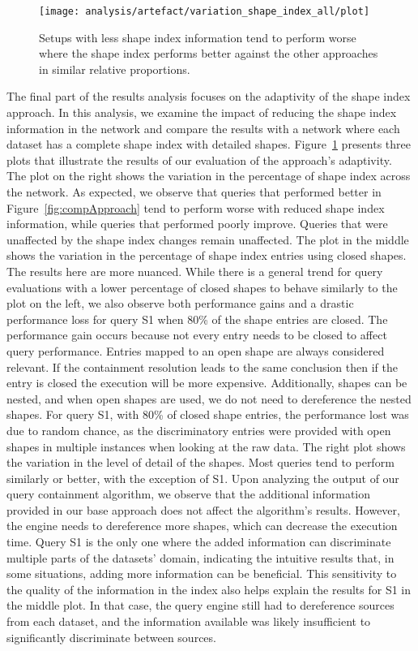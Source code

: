 \begin{figure}[h]
    \centering
    \texttt{[image: analysis/artefact/variation\_shape\_index\_all/plot]}
    \caption{Setups with less shape index information tend to perform worse where the shape index performs
    better against the other approaches in similar relative proportions.
    }
    \label{fig:adaptShapeIndex}
\end{figure}

The final part of the results analysis focuses on the adaptivity of the shape index approach.
In this analysis, we examine the impact of reducing the shape index information in the network and compare the results with a network where each dataset has a complete shape index with detailed shapes.
Figure~\ref{fig:adaptShapeIndex} presents three plots that illustrate the results of our evaluation of the approach's adaptivity.
The plot on the right shows the variation in the percentage of shape index across the network. 
As expected, we observe that queries that performed better in Figure~\ref{fig:compApproach} tend to perform worse with reduced shape index information, while queries that performed poorly improve. 
Queries that were unaffected by the shape index changes remain unaffected.
The plot in the middle shows the variation in the percentage of shape index entries using closed shapes.
The results here are more nuanced.
While there is a general trend for query evaluations with a lower percentage of closed shapes to behave similarly to the plot on the left, we also observe both performance gains and a drastic performance loss for query S1 when 80\% of the shape entries are closed.
The performance gain occurs because not every entry needs to be closed to affect query performance.
Entries mapped to an open shape are always considered relevant.
If the containment resolution leads to the same conclusion then if the entry is closed the execution will be more expensive. 
Additionally, shapes can be nested, and when open shapes are used, we do not need to dereference the nested shapes.
For query S1, with 80\% of closed shape entries, the performance lost was due to random chance, as the discriminatory entries were provided with open shapes in multiple instances when looking at the raw data.
The right plot shows the variation in the level of detail of the shapes.
Most queries tend to perform similarly or better, with the exception of S1.
Upon analyzing the output of our query containment algorithm, we observe that the additional information provided in our base approach does not affect the algorithm’s results.
However, the engine needs to dereference more shapes, which can decrease the execution time.
Query S1 is the only one where the added information can discriminate multiple parts of the datasets' domain, indicating the intuitive results that, in some situations, adding more information can be beneficial.
This sensitivity to the quality of the information in the index also helps explain the results for S1 in the middle plot. 
In that case, the query engine still had to dereference sources from each dataset, and the information available was likely insufficient to significantly discriminate between sources.


